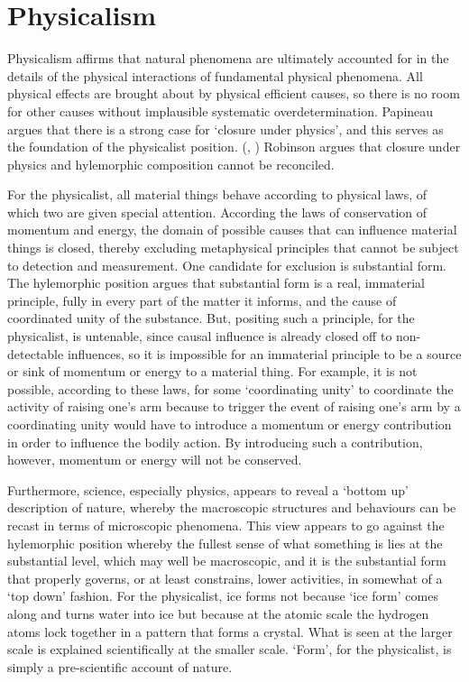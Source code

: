 \section{Physicalism}

Physicalism affirms that natural phenomena are ultimately accounted for in the details of the physical interactions of fundamental physical phenomena.  All physical effects are brought about by physical efficient causes, so there is no room for other causes without implausible systematic overdetermination. Papineau argues that there is a strong case for `closure under physics', and this serves as the foundation of the physicalist position. (\cite[][]{Papineau2001-PAPTRO}, \cite[][]{papineau2002thinking}) Robinson argues that closure under physics and hylemorphic composition cannot be reconciled. \parencite[][]{Robinson2014-ROBMHA-3}

For the physicalist, all material things behave according to physical laws, of which two are given special attention.
According the laws of conservation of momentum and energy, the domain of possible causes that can influence material things is closed, thereby excluding metaphysical principles that cannot be subject to detection and measurement.
One candidate for exclusion is substantial form. The hylemorphic position argues that substantial form is a real, immaterial principle, fully in every part of the matter it informs, and the cause of coordinated unity of the substance. But, positing such a principle, for the physicalist, is untenable, since causal influence is already closed off to non-detectable influences, so it is impossible for an immaterial principle to be a source or sink of momentum or energy to a material thing. For example, it is not possible, according to these laws, for some `coordinating unity' to coordinate the activity of raising one's arm because to trigger the event of raising one's arm by a coordinating unity would have to introduce a momentum or energy contribution in order to influence the bodily action. By introducing such a contribution, however, momentum or energy will not be conserved.

Furthermore, science, especially physics, appears to reveal a `bottom up' description of nature, whereby the macroscopic structures and behaviours can be recast in terms of microscopic phenomena. This view appears to go against the hylemorphic position whereby the fullest sense of what something is lies at the substantial level, which may well be macroscopic, and it is the substantial form that properly governs, or at least constrains, lower activities, in somewhat of a `top down' fashion. For the physicalist, ice forms not because `ice form' comes along and turns water into ice but because at the atomic scale the hydrogen atoms lock together in a pattern that forms a crystal. What is seen at the larger scale is explained scientifically at the smaller scale. `Form', for the physicalist, is simply a pre-scientific account of nature.

